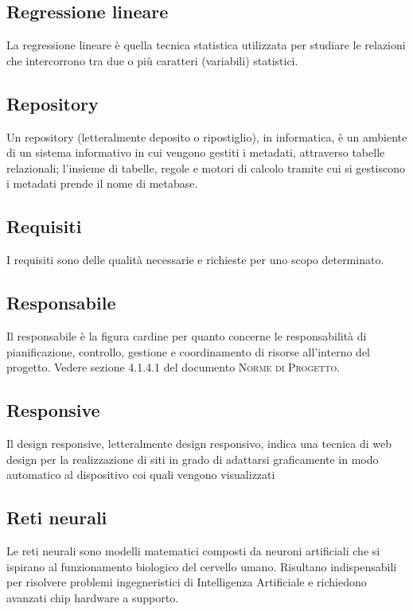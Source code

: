 
\subsection*{Regressione lineare}
La regressione lineare è quella tecnica statistica utilizzata per studiare le relazioni che intercorrono tra due o più caratteri (variabili) statistici.

\subsection*{Repository}
Un repository (letteralmente deposito o ripostiglio), in informatica, è un ambiente di un sistema informativo  in cui vengono gestiti i metadati, attraverso tabelle relazionali; l'insieme di tabelle, regole e motori di calcolo tramite cui si gestiscono i metadati prende il nome di metabase.

\subsection*{Requisiti}
I requisiti sono delle qualità necessarie e richieste per uno scopo determinato.

\subsection*{Responsabile}
Il responsabile è la figura cardine per quanto concerne le responsabilità di pianificazione, controllo, gestione e coordinamento di risorse all’interno del progetto. Vedere sezione 4.1.4.1 del documento \textsc{Norme di Progetto}.

\subsection*{Responsive}
Il design responsive, letteralmente design responsivo, indica una tecnica di web design per la realizzazione di siti in grado di adattarsi graficamente in modo automatico al dispositivo coi quali vengono visualizzati

\subsection*{Reti neurali}
Le reti neurali sono modelli matematici composti da neuroni artificiali che si ispirano al funzionamento biologico del cervello umano. 
Risultano indispensabili per risolvere problemi ingegneristici di Intelligenza Artificiale e richiedono avanzati chip hardware a supporto.

